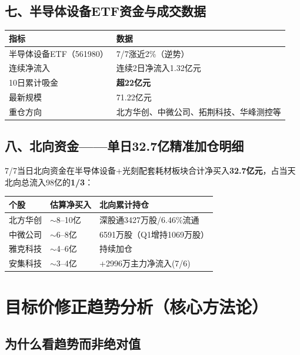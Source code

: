 \documentclass[a4paper,11pt,fontset=none]{ctexart}
\begin{document}
\subsection*{七、半导体设备ETF资金与成交数据}

\begin{tabularx}{\textwidth}{L{3.5cm}X}
\toprule
\textbf{指标} & \textbf{数据} \\
\midrule
半导体设备ETF（561980） & 7/7涨近2\%（逆势）\\
连续净流入 & 连续2日净流入1.32亿元 \\
10日累计吸金 & \textbf{超22亿元} \\
最新规模 & 71.22亿元 \\
重仓方向 & 北方华创、中微公司、拓荆科技、华峰测控等 \\
\bottomrule
\end{tabularx}

\subsection*{八、北向资金——单日32.7亿精准加仓明细}

7/7当日北向资金在半导体设备+光刻配套耗材板块合计净买入\textbf{32.7亿元}，占当天北向总流入98亿的\textbf{1/3}：

\begin{tabularx}{\textwidth}{L{3cm}L{2cm}X}
\toprule
\textbf{个股} & \textbf{估算净买入} & \textbf{北向累计持仓} \\
\midrule
北方华创 & $\sim$8--10亿 & 深股通3427万股/6.46\%流通 \\
中微公司 & $\sim$6--8亿 & 6591万股（Q1增持1069万股） \\
雅克科技 & $\sim$4--6亿 & 持续加仓 \\
安集科技 & $\sim$3--4亿 & +2996万主力净流入(7/6) \\
\bottomrule
\end{tabularx}

\newpage
\section{目标价修正趋势分析（核心方法论）}

\subsection*{为什么看趋势而非绝对值}
\end{document}
